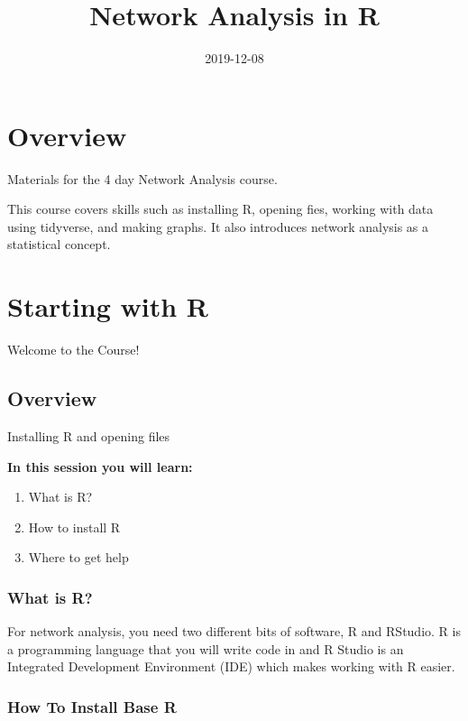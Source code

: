 \documentclass[]{book}
\title{Network Analysis in R}
\author{}
\date{2019-12-08}
\providecommand{\tightlist}{%
  \setlength{\itemsep}{0pt}\setlength{\parskip}{0pt}}
\begin{document}
\maketitle

{
\setcounter{tocdepth}{1}
\tableofcontents
}
\hypertarget{overview}{%
\chapter*{Overview}\label{overview}}

Materials for the 4 day Network Analysis course.

This course covers skills such as installing R, opening fies, working with data using tidyverse, and making graphs. It also introduces network analysis as a statistical concept.

\hypertarget{starting-with-r}{%
\chapter{Starting with R}\label{starting-with-r}}

{Welcome to the Course!}

\hypertarget{overview-1}{%
\section{Overview}\label{overview-1}}

Installing R and opening files

\textbf{In this session you will learn:}

\begin{enumerate}
\def\labelenumi{\arabic{enumi}.}
\tightlist
\item
  What is R?
\item
  How to install R
\item
  Where to get help
\end{enumerate}

\hypertarget{what-is-r}{%
\subsection{What is R?}\label{what-is-r}}

For network analysis, you need two different bits of software, R and RStudio. R is a programming language that you will write code in and R Studio is an Integrated Development Environment (IDE) which makes working with R easier.

\hypertarget{how-to-install-base-r}{%
\subsection{How To Install Base R}\label{how-to-install-base-r}}
\end{document}
